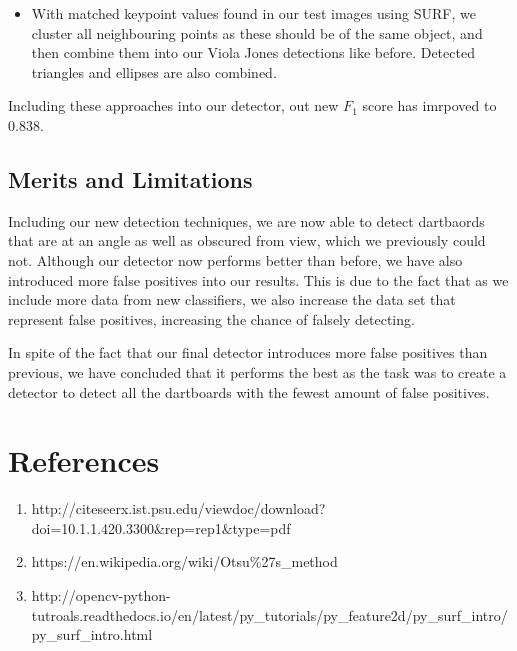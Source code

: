 \documentclass[a4paper]{article}
\begin{document}
\begin{itemize}
\item With matched keypoint values found in our test images using SURF, we
  cluster all neighbouring points as these should be of the same object, and
    then combine them into our Viola Jones detections like before. Detected
    triangles and ellipses are also combined.


\end{itemize}
Including these approaches into our detector, out new \(F_{1}\) score has imrpoved to 0.838.


\vspace{-2em}
\begin{figure}[H]
  \centering
  \hfill
  \hfill
  \hfill
  \hfill
\end{figure}

\subsection*{Merits and Limitations}
Including our new detection techniques, we are now able to detect dartbaords
that are at an angle as well as obscured from view, which we previously could
not. Although our detector now performs better than before, we have also
introduced more false positives into our results. This is due to the fact that
as we include more data from new classifiers, we also increase the data set
that represent false positives, increasing the chance of falsely detecting.

In spite of the fact that our final detector introduces more false positives
than previous, we have concluded that it performs the best as the task was to
create a detector to detect all the dartboards with the fewest amount of false
positives.


\section*{References}

\begin{enumerate}
\item http://citeseerx.ist.psu.edu/viewdoc/download?doi=10.1.1.420.3300\&rep=rep1\&type=pdf
\item https://en.wikipedia.org/wiki/Otsu\%27s\_method
\item http://opencv-python-tutroals.readthedocs.io/en/latest/py\_tutorials/py\_feature2d/py\_surf\_intro/py\_surf\_intro.html
\end{enumerate}

\vspace{-4em}
\end{document}
